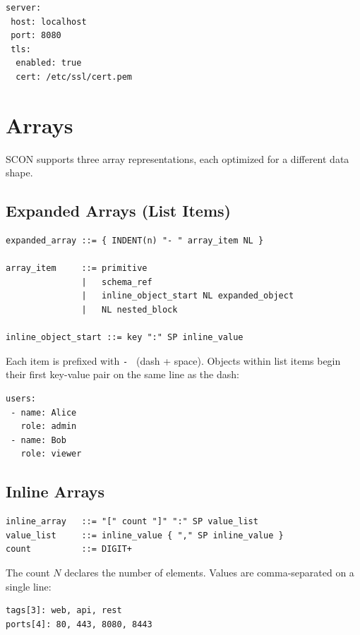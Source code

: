 \documentclass[11pt, a4paper]{article}
\begin{document}
\begin{lstlisting}[style=scon]
server:
 host: localhost
 port: 8080
 tls:
  enabled: true
  cert: /etc/ssl/cert.pem
\end{lstlisting}

\section{Arrays}
\label{sec:arrays}

SCON supports three array representations, each optimized for a different data shape.

\subsection{Expanded Arrays (List Items)}
\label{sec:expanded-arrays}

\begin{lstlisting}[style=ebnf]
expanded_array ::= { INDENT(n) "- " array_item NL }

array_item     ::= primitive
               |   schema_ref
               |   inline_object_start NL expanded_object
               |   NL nested_block

inline_object_start ::= key ":" SP inline_value
\end{lstlisting}

\noindent Each item is prefixed with \texttt{-~} (dash + space). Objects within
list items begin their first key-value pair on the same line as the dash:

\begin{lstlisting}[style=scon]
users:
 - name: Alice
   role: admin
 - name: Bob
   role: viewer
\end{lstlisting}

\subsection{Inline Arrays}
\label{sec:inline-arrays}

\begin{lstlisting}[style=ebnf]
inline_array   ::= "[" count "]" ":" SP value_list
value_list     ::= inline_value { "," SP inline_value }
count          ::= DIGIT+
\end{lstlisting}

\noindent The count $N$ declares the number of elements. Values are
comma-separated on a single line:

\begin{lstlisting}[style=scon]
tags[3]: web, api, rest
ports[4]: 80, 443, 8080, 8443
\end{lstlisting}
\end{document}
